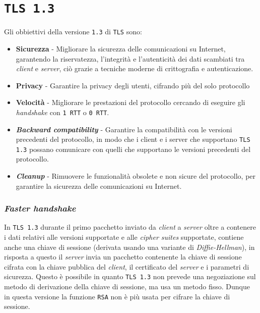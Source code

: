 \section{\texttt{TLS 1.3}}
    Gli obbiettivi della versione \texttt{1.3} di \texttt{TLS} sono: \begin{itemize}
        \item \textbf{Sicurezza} - Migliorare la sicurezza delle comunicazioni su Internet, garantendo la riservatezza, l'integrità e l'autenticità dei dati scambiati tra \textit{client} e \textit{server}, ciò grazie a tecniche moderne di crittografia e autenticazione.
        \item \textbf{Privacy} - Garantire la privacy degli utenti, cifrando più del solo protocollo
        \item \textbf{Velocità} - Migliorare le prestazioni del protocollo cercando di eseguire gli \textit{handshake} con \texttt{1 RTT} o \texttt{0 RTT}.
        \item \textbf{\textit{Backward compatibility}} - Garantire la compatibilità con le versioni precedenti del protocollo, in modo che i client e i server che supportano \texttt{TLS 1.3} possano comunicare con quelli che supportano le versioni precedenti del protocollo.
        \item \textbf{\textit{Cleanup}} - Rimuovere le funzionalità obsolete e non sicure del protocollo, per garantire la sicurezza delle comunicazioni su Internet.
    \end{itemize}
    \subsubsection{\textit{Faster handshake}}
    In \texttt{TLS 1.3} durante il primo pacchetto inviato da \textit{client} a \textit{server} oltre a contenere i dati relativi alle versioni supportate e alle \textit{cipher suites} supportate, contiene anche una chiave di sessione (derivata usando una variante di \textit{Diffie-Hellman}), in risposta a questo il \textit{server} invia un pacchetto contenente la chiave di sessione cifrata con la chiave pubblica del \textit{client}, il certificato del \textit{server} e i parametri di sicurezza. Questo è possibile in quanto \texttt{TLS 1.3} non prevede una negoziazione sul metodo di derivazione della chiave di sessione, ma usa un metodo fisso. Dunque in questa versione la funzione \texttt{RSA} non è più usata per cifrare la chiave di sessione.
